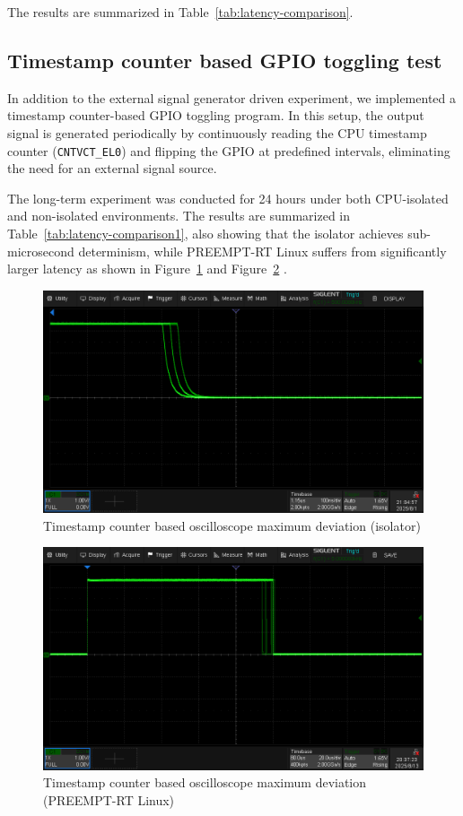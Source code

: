 \documentclass[letterpaper]{article}
\begin{document}
The results are summarized in Table~\ref{tab:latency-comparison}.

\subsection {Timestamp counter based GPIO toggling test} 
In addition to the external signal generator driven experiment, we implemented a timestamp counter-based GPIO toggling program. In this setup, the output signal is generated periodically by continuously reading the CPU timestamp counter (\texttt{CNTVCT\_EL0}) and flipping the GPIO at predefined intervals, eliminating the need for an external signal source.

The long-term experiment was conducted for 24 hours under both CPU-isolated and non-isolated environments. The results are summarized in Table~\ref{tab:latency-comparison1}, also showing that the isolator achieves sub-microsecond determinism, while PREEMPT-RT Linux suffers from significantly larger latency
as shown in Figure~\ref{fig:islcountergpio} and Figure~\ref{fig:linuxcountergpio} .

\begin{figure}[h]
  \centering
  \includegraphics[width=0.8\linewidth]{figures/islcountergpio.png}
  \caption{Timestamp counter based oscilloscope maximum deviation (isolator)}
  \label{fig:islcountergpio}
\end{figure}

\begin{figure}[h]
  \centering
  \includegraphics[width=0.8\linewidth]{figures/linuxcountergpio.png}
  \caption{Timestamp counter based oscilloscope maximum deviation (PREEMPT-RT Linux)}
  \label{fig:linuxcountergpio}
\end{figure}
\end{document}
